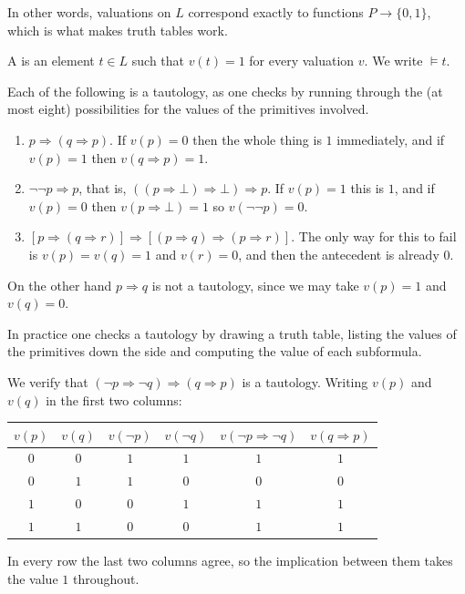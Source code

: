 In other words, valuations on $L$ correspond exactly to functions $P \to \{0,1\}$, which is what makes truth tables work.

\begin{definition}[Tautology]
  A  is an element $t \in L$ such that $v(t) = 1$ for every valuation $v$. We write $\models t$.
\end{definition}

\begin{example}
  Each of the following is a tautology, as one checks by running through the (at most eight) possibilities for the values of the primitives involved.
  \begin{enumerate}[label=(\roman*)]
    \item $p \Rightarrow (q \Rightarrow p)$. If $v(p) = 0$ then the whole thing is $1$ immediately, and if $v(p) = 1$ then $v(q \Rightarrow p) = 1$.
    \item $\lnot \lnot p \Rightarrow p$, that is, $((p \Rightarrow \bot) \Rightarrow \bot) \Rightarrow p$. If $v(p) = 1$ this is $1$, and if $v(p) = 0$ then $v(p \Rightarrow \bot) = 1$ so $v(\lnot \lnot p) = 0$.
    \item $[p \Rightarrow (q \Rightarrow r)] \Rightarrow [(p \Rightarrow q) \Rightarrow (p \Rightarrow r)]$. The only way for this to fail is $v(p) = v(q) = 1$ and $v(r) = 0$, and then the antecedent is already $0$.
  \end{enumerate}
  On the other hand $p \Rightarrow q$ is not a tautology, since we may take $v(p) = 1$ and $v(q) = 0$.
\end{example}

In practice one checks a tautology by drawing a truth table, listing the values of the primitives down the side and computing the value of each subformula.

\begin{example}
  We verify that $(\lnot p \Rightarrow \lnot q) \Rightarrow (q \Rightarrow p)$ is a tautology. Writing $v(p)$ and $v(q)$ in the first two columns:
  \begin{center}
    \begin{tabular}{cc|cc|cc}
      $v(p)$ & $v(q)$ & $v(\lnot p)$ & $v(\lnot q)$ & $v(\lnot p \Rightarrow \lnot q)$ & $v(q \Rightarrow p)$ \\ \hline
      $0$ & $0$ & $1$ & $1$ & $1$ & $1$ \\
      $0$ & $1$ & $1$ & $0$ & $0$ & $0$ \\
      $1$ & $0$ & $0$ & $1$ & $1$ & $1$ \\
      $1$ & $1$ & $0$ & $0$ & $1$ & $1$ \\
    \end{tabular}
  \end{center}
  In every row the last two columns agree, so the implication between them takes the value $1$ throughout.
\end{example}

